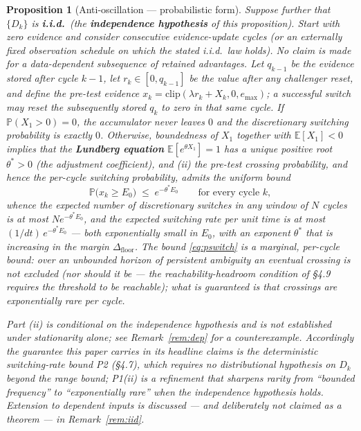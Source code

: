 \documentclass[11pt]{article}
\newtheorem{proposition}{Proposition}
\newcommand{\Dfloor}{\Delta_{\text{floor}}}
\begin{document}
\begin{proposition}[Anti-oscillation --- probabilistic form]
Suppose further that $\{D_k\}$ is \textbf{i.i.d.}\ (the \textbf{independence hypothesis} of this proposition). Start with zero evidence and consider consecutive evidence-update cycles (or an externally fixed observation schedule on which the stated i.i.d.\ law holds). No claim is made for a data-dependent subsequence of retained advantages. Let $q_{k-1}$ be the evidence stored after cycle $k-1$, let $r_k\in[0,q_{k-1}]$ be the value after any challenger reset, and define the pre-test evidence $x_k=\mathrm{clip}(\lambda r_k+X_k,0,e_{\max})$; a successful switch may reset the subsequently stored $q_k$ to zero in that same cycle. If $\mathbb{P}(X_1 > 0) = 0$, the accumulator never leaves $0$ and the discretionary switching probability is exactly $0$. Otherwise, boundedness of $X_1$ together with $\mathbb{E}[X_1] < 0$ implies that the \textbf{Lundberg equation} $\mathbb{E}[e^{\theta X_1}] = 1$ has a unique positive root $\theta^* > 0$ (the adjustment coefficient), and (ii) the pre-test crossing probability, and hence the per-cycle switching probability, admits the uniform bound
\begin{equation}
\mathbb{P}\big(x_k \ge E_0\big) \;\le\; e^{-\theta^* E_0} \qquad \text{for every cycle } k,
\label{eq:pswitch}
\end{equation}
whence the expected number of discretionary switches in any window of $N$ cycles is at most $N e^{-\theta^* E_0}$, and the expected switching rate per unit time is at most $(1/dt)\, e^{-\theta^* E_0}$ --- both exponentially small in $E_0$, with an exponent $\theta^*$ that is increasing in the margin $\Dfloor$. The bound \eqref{eq:pswitch} is a \emph{marginal, per-cycle} bound: over an unbounded horizon of persistent ambiguity an eventual crossing is not excluded (nor should it be --- the reachability-headroom condition of \S4.9 requires the threshold to be reachable); what is guaranteed is that crossings are exponentially rare per cycle.

Part (ii) is \emph{conditional on the independence hypothesis and is not established under stationarity alone}; see Remark~\ref{rem:dep} for a counterexample. Accordingly the guarantee this paper carries in its headline claims is the \emph{deterministic} switching-rate bound P2 (\S4.7), which requires no distributional hypothesis on $D_k$ beyond the range bound; P1(ii) is a refinement that sharpens rarity from ``bounded frequency'' to ``exponentially rare'' when the independence hypothesis holds. Extension to dependent inputs is discussed --- and deliberately \emph{not} claimed as a theorem --- in Remark~\ref{rem:iid}.
\end{proposition}
\end{document}
